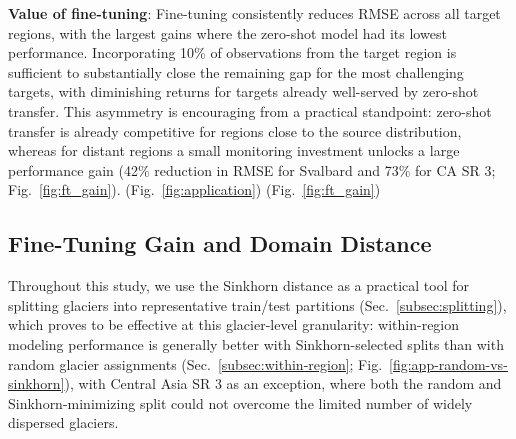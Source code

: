 \documentclass[draft]{agujournal2019}
\begin{document}
\textbf{Value of fine-tuning}: Fine-tuning consistently reduces RMSE across all target regions, with the largest gains where the zero-shot model had its lowest performance. Incorporating 10\% of observations from the target region is sufficient to substantially close the remaining gap for the most challenging targets, with diminishing returns for targets already well-served by zero-shot transfer. This asymmetry is encouraging from a practical standpoint: zero-shot transfer is already competitive for regions close to the source distribution, whereas for distant regions a small monitoring investment unlocks a large performance gain (42\% reduction in RMSE for Svalbard and 73\% for CA SR 3; Fig.~\ref{fig:ft_gain}).  \citep[e.g.,][]{Huss_2015, Rounce_2020}(Fig.~\ref{fig:application}) (Fig.~\ref{fig:ft_gain})

\subsection{Fine-Tuning Gain and Domain Distance}\label{sec:disc-sinkhorn}
Throughout this study, we use the Sinkhorn distance as a practical tool for splitting glaciers into representative train/test partitions (Sec.~\ref{subsec:splitting}), which proves to be effective at this glacier-level granularity: within-region modeling performance is generally better with Sinkhorn-selected splits than with random glacier assignments (Sec.~\ref{subsec:within-region}; Fig.~\ref{fig:app-random-vs-sinkhorn}), with Central Asia SR 3 as an exception, where both the random and Sinkhorn-minimizing split could not overcome the limited number of widely dispersed glaciers.
\end{document}
